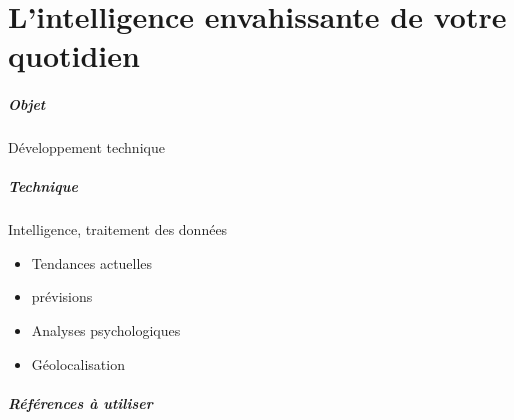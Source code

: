 \chapter{L'intelligence envahissante de votre quotidien}
\paragraph{Objet} Développement technique
\paragraph{Technique} Intelligence, traitement des données
\begin{itemize}
    \item Tendances actuelles
    \item prévisions
    \item Analyses psychologiques
    \item Géolocalisation
\end{itemize}

\paragraph{Références à utiliser}
\cite{GhostInTheShell}
\cite{Moore0}
\cite{ProgrammableCity0}
\cite{ProgrammableCity1}
\cite{PsychoPass}
\cite{University1}



 